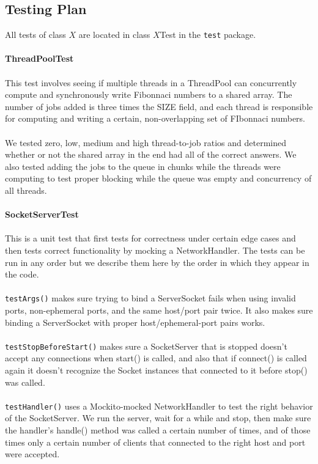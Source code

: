 \subsection{Testing Plan}
All tests of class $X$ are located in class $X$Test in the \texttt{test} package. \\\\
\textbf{ThreadPoolTest} \\\\
This test involves seeing if multiple threads in a ThreadPool can concurrently compute and synchronously write Fibonnaci numbers to a shared array. The number of jobs added is three times the SIZE field, and each thread is responsible for computing and writing a certain, non-overlapping set of FIbonnaci numbers. \\\\
We tested zero, low, medium and high thread-to-job ratios and determined whether or not the shared array in the end had all of the correct answers. We also tested adding the jobs to the queue in chunks while the threads were computing to test proper blocking while the queue was empty and concurrency of all threads. \\\\
\textbf{SocketServerTest} \\\\
This is a unit test that first tests for correctness under certain edge cases and then tests correct functionality by mocking a NetworkHandler. The tests can be run in any order but we describe them here by the order in which they appear in the code. \\\\
\texttt{testArgs()} makes sure trying to bind a ServerSocket fails when using invalid ports, non-ephemeral ports, and the same host/port pair twice. It also makes sure binding a ServerSocket with proper host/ephemeral-port pairs works. \\\\
\texttt{testStopBeforeStart()} makes sure a SocketServer that is stopped doesn't accept any connections when start() is called, and also that if connect() is called again it doesn't recognize the Socket instances that connected to it before stop() was called. \\\\
\texttt{testHandler()} uses a Mockito-mocked NetworkHandler to test the right behavior of the SocketServer. We run the server, wait for a while and stop, then make sure the handler's handle() method was called a certain number of times, and of those times only a certain number of clients that connected to the right host and port were accepted. \\\\
